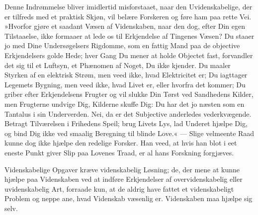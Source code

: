 \documentclass[12pt]{book}
\newcommand{\apage}[1]{\marginnote{\footnotesize\textit{[#1]}}}
\begin{document}
Denne Indrømmelse bliver imidlertid misforstaaet, naar den
Uvidenskabelige, der er tilfreds med et praktisk Skjøn, vil belære
Forskeren og føre ham paa rette Vei. »Hvorfor gjøre et saadant Væsen af
Videnskaben, naar den dog, efter Din egen Tilstaaelse, ikke formaaer at
lede os til Erkjendelse af Tingenes Væsen? Du staaer jo med Dine
Undersøgelsers Rigdomme, som en fattig Mand paa de objective Erkjendelsers
golde Hede; hver Gang Du mener at holde Objectet fast, forvandler det sig
til et Luftsyn, et Phænomen af Noget, Du ikke kjender. Du maaler Styrken af
en elektrisk Strøm, men veed ikke, hvad Elektricitet er; Du iagttager
Legemets Bygning, men veed ikke, hvad Livet er, eller hvorfra det kommer; \apage{54} 
Du griber efter Erkjendelsens Frugter og vil slukke Din Tørst ved
Sandhedens Kilder, men Frugterne undvige Dig, Kilderne skuffe Dig: Du har
det jo næsten som en Tantalus i sin Underverden. Nei, da er det Subjective
anderledes vederkvægende. Betragt Tilværelsen i Frihedens Speil; brug
Livets Lys, lad Underet hjælpe Dig, og bind Dig ikke ved smaalig Beregning
til blinde Love.« --- Slige velmeente Raad kunne dog ikke hjælpe den redelige
Forsker. Han veed, at hvis han blot i eet eneste Punkt giver Slip paa
Lovenes Traad, er al hans Forskning forgjæves.

Videnskabelige Opgaver kræve videnskabelig Løsning; de, der mene at kunne
hjælpe paa Videnskaben ved at indføre Erkjendelser af overvidenskabelig
eller uvidenskabelig Art, forraade kun, at de aldrig have fattet et
videnskabeligt Problem og neppe ane, hvad Videnskab væsenlig er.
Videnskaben maa hjælpe sig selv.
\end{document}
